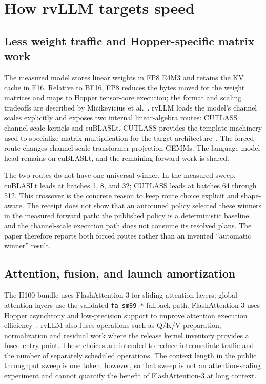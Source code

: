 \section{How rvLLM targets speed}

\subsection{Less weight traffic and Hopper-specific matrix work}

The measured model stores linear weights in FP8 E4M3 and retains the KV cache
in F16. Relative to BF16, FP8 reduces the bytes moved for the weight matrices and
maps to Hopper tensor-core execution; the format and scaling tradeoffs are
described by Micikevicius et al.~\citep{micikevicius2022fp8}. rvLLM loads the
model's channel scales explicitly and exposes two internal linear-algebra
routes: CUTLASS channel-scale kernels and cuBLASLt. CUTLASS provides the
template machinery used to specialize matrix multiplication for the target
architecture~\citep{nvidia2026cutlass}. The forced route changes channel-scale
transformer projection GEMMs. The language-model head remains on cuBLASLt, and
the remaining forward work is shared.

The two routes do not have one universal winner. In the measured sweep,
cuBLASLt leads at batches 1, 8, and 32; CUTLASS leads at batches 64 through
512. This crossover is the concrete reason to keep route choice explicit and
shape-aware. The receipt does not show that an autotuned policy selected these
winners in the measured forward path: the published policy is a deterministic
baseline, and the channel-scale execution path does not consume its resolved
plans. The paper therefore reports both forced routes rather than an invented
``automatic winner'' result.

\subsection{Attention, fusion, and launch amortization}

The H100 bundle uses FlashAttention-3 for sliding-attention layers; global
attention layers use the validated \texttt{fa\_sm89\_*} fallback path.
FlashAttention-3 uses Hopper asynchrony and low-precision support to improve
attention execution efficiency~\citep{shah2024flashattention3}. rvLLM also
fuses operations such as Q/K/V preparation, normalization and residual work
where the release kernel inventory provides a fused entry point. These choices
are intended to reduce intermediate traffic and the number of separately
scheduled operations. The context length in the public throughput sweep is one
token, however, so that sweep is not an attention-scaling experiment and cannot
quantify the benefit of FlashAttention-3 at long context.

